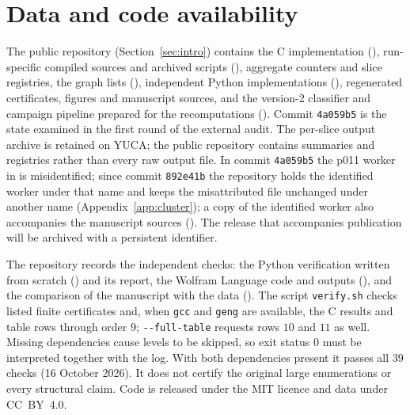 \section{Data and code availability}\label{sec:data}

The public repository (Section~\ref{sec:intro}) contains the C implementation (\protect{}), run-specific compiled sources and archived scripts (\protect{}), aggregate counters and slice registries, the graph lists (\protect{}), independent Python implementations (\protect{}), regenerated certificates, figures and manuscript sources, and the version-2 classifier and campaign pipeline prepared for the recomputations (\protect{}). Commit \texttt{4a059b5} is the state examined in the first round of the external audit. The per-slice output archive is retained on YUCA; the public repository contains summaries and registries rather than every raw output file. In commit \texttt{4a059b5} the p011 worker in \protect{} is misidentified; since commit \texttt{892e41b} the repository holds the identified worker under that name and keeps the misattributed file unchanged under another name (Appendix~\ref{app:cluster}); a copy of the identified worker also accompanies the manuscript sources (\protect{}). The release that accompanies publication will be archived with a persistent identifier.

The repository records the independent checks: the Python verification written from scratch (\protect{}) and its report, the Wolfram Language code and outputs (\protect{}), and the comparison of the manuscript with the data (\protect{}). The script \texttt{verify.sh} checks listed finite certificates and, when \texttt{gcc} and \texttt{geng} are available, the C results and table rows through order $9$; \texttt{-{}-full-table} requests rows $10$ and $11$ as well. Missing dependencies cause levels to be skipped, so exit status $0$ must be interpreted together with the log. With both dependencies present it passes all $39$ checks (16 October 2026). It does not certify the original large enumerations or every structural claim. Code is released under the MIT licence and data under CC~BY~4.0.
